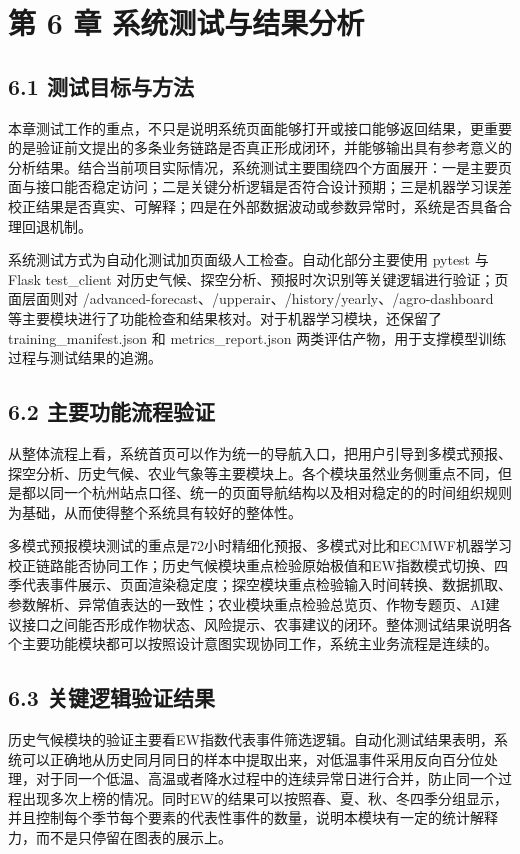 \section{第 6 章 系统测试与结果分析}

\subsection{6.1 测试目标与方法}

本章测试工作的重点，不只是说明系统页面能够打开或接口能够返回结果，更重要的是验证前文提出的多条业务链路是否真正形成闭环，并能够输出具有参考意义的分析结果。结合当前项目实际情况，系统测试主要围绕四个方面展开：一是主要页面与接口能否稳定访问；二是关键分析逻辑是否符合设计预期；三是机器学习误差校正结果是否真实、可解释；四是在外部数据波动或参数异常时，系统是否具备合理回退机制。

系统测试方式为自动化测试加页面级人工检查。自动化部分主要使用 pytest 与 Flask test\_client 对历史气候、探空分析、预报时次识别等关键逻辑进行验证；页面层面则对 /advanced-forecast、/upperair、/history/yearly、/agro-dashboard 等主要模块进行了功能检查和结果核对。对于机器学习模块，还保留了 training\_manifest.json 和 metrics\_report.json 两类评估产物，用于支撑模型训练过程与测试结果的追溯。

\subsection{6.2 主要功能流程验证}

从整体流程上看，系统首页可以作为统一的导航入口，把用户引导到多模式预报、探空分析、历史气候、农业气象等主要模块上。各个模块虽然业务侧重点不同，但是都以同一个杭州站点口径、统一的页面导航结构以及相对稳定的的时间组织规则为基础，从而使得整个系统具有较好的整体性。

多模式预报模块测试的重点是72小时精细化预报、多模式对比和ECMWF机器学习校正链路能否协同工作；历史气候模块重点检验原始极值和EW指数模式切换、四季代表事件展示、页面渲染稳定度；探空模块重点检验输入时间转换、数据抓取、参数解析、异常值表达的一致性；农业模块重点检验总览页、作物专题页、AI建议接口之间能否形成作物状态、风险提示、农事建议的闭环。整体测试结果说明各个主要功能模块都可以按照设计意图实现协同工作，系统主业务流程是连续的。

\subsection{6.3 关键逻辑验证结果}

历史气候模块的验证主要看EW指数代表事件筛选逻辑。自动化测试结果表明，系统可以正确地从历史同月同日的样本中提取出来，对低温事件采用反向百分位处理，对于同一个低温、高温或者降水过程中的连续异常日进行合并，防止同一个过程出现多次上榜的情况。同时EW的结果可以按照春、夏、秋、冬四季分组显示，并且控制每个季节每个要素的代表性事件的数量，说明本模块有一定的统计解释力，而不是只停留在图表的展示上。

